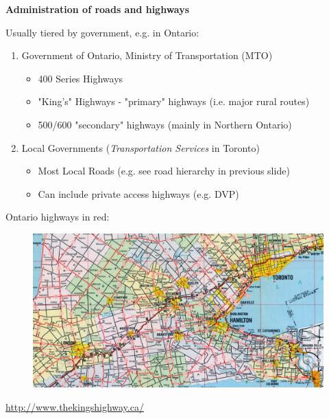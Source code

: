 \documentclass[aspectratio=169]{beamer}
\begin{document}
\begin{frame}
	
	\textbf{Administration of roads and highways}
	
	\vspace{2mm}
	
	Usually tiered by government, e.g. in Ontario:
	
	\begin{enumerate}
		
		\item Government of Ontario, Ministry of Transportation (MTO)
		\begin{itemize}
			\item 400 Series Highways
			\item "King's" Highways - "primary" highways (i.e. major rural routes)
			\item 500/600 "secondary" highways (mainly in Northern Ontario)	
		\end{itemize}
	
		\item Local Governments (\textit{Transportation Services} in Toronto)
		\begin{itemize}
			\item Most Local Roads (e.g. see road hierarchy in previous slide)
			\item Can include private access highways (e.g. DVP)
		\end{itemize}
		
	\end{enumerate}
	
\end{frame}



\begin{frame}
	
	Ontario highways in red:
	
		\begin{figure}
			\centering
			\includegraphics[width=1\linewidth]{images/ontario_road_map.png}
		\end{figure}
	
	\tiny\url{http://www.thekingshighway.ca/}

\end{frame}
\end{document}
